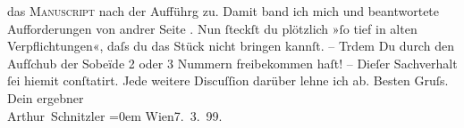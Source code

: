 \begin{ledgroupsized}[t]{13cm}
               das \textsc{Manuscript} nach der Aufführg zu. Damit band ich mich
               und beantwortete Aufforderungen von andrer Seite \label{K_L00899_2v}\label{K_L00899_2h}. Nun ſteckſt du plötzlich »ſo tief in alten Verpflichtungen«, daſs
               du das Stück {\pb}nicht
               bringen kannſt. – Trdem Du durch den Aufſchub der Sobeïde 2
               oder 3 Nummern freibekommen haſt! – \pend
           \pstart
           Dieſer Sachverhalt ſei hiemit conſtatirt. Jede weitere Discuſſion darüber lehne ich
               ab.\pend
           \pstart
           Besten Gruſs. Dein ergebner{\\[\baselineskip]}\spacefill\mbox{Arthur Schnitzler}\pend
           \leftskip=0em{}\pstart
           Wien7. 3. 99.\pend
                     \endnumbering{}\end{ledgroupsized}  \newcommand{\dateiname}{L00899}\newcommand{\titel}{Arthur Schnitzler an Hermann Bahr, 7. 3. 1899}\newcommand{\editorInnen}{ Kurt Ifkovits,  Martin Anton Müller}
            \footnotesize
\begin{ledgroupsized}[t]{11.5cm}
\end{ledgroupsized}
         
      